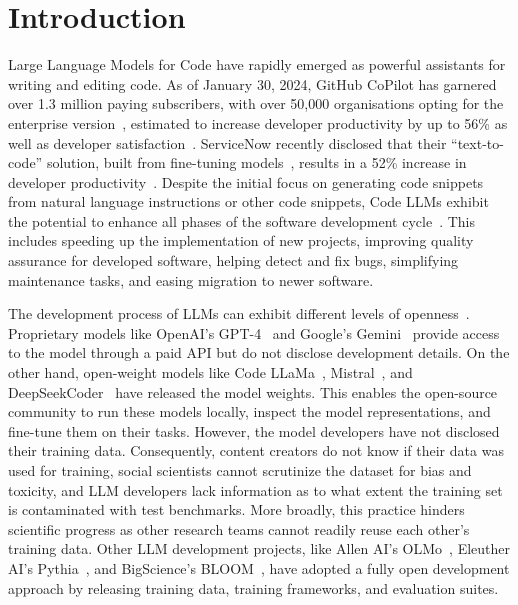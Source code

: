 \documentclass[10pt]{article} %
\begin{document}
\section{Introduction}
Large Language Models for Code \citep[Code LLMs;][]{chen2021evaluating,nijkamp:codegen,roziere2023code,guo2024deepseek} have rapidly emerged as powerful assistants for writing and editing code. As of January 30, 2024, GitHub CoPilot has garnered over 1.3 million paying subscribers, with over 50,000 organisations opting for the enterprise version~\citep{msft_q2_2024}, estimated to increase developer productivity by up to 56\% as well as developer satisfaction~\citep{peng2023impact,ziegler2024measuring}. ServiceNow recently disclosed that their ``text-to-code'' solution, built from fine-tuning \starcoderbase{} models~\citep{li2023starcoder}, results in a 52\% increase in developer productivity~\citep{servicenow2024q4earnings}. Despite the initial focus on generating code snippets from natural language instructions or other code snippets, Code LLMs exhibit the potential to enhance all phases of the software development cycle~\citep{hou2023large,fan2023large,wang2023software,zhuo2023data,chai2023ernie-code}. This includes speeding up the implementation of new projects, improving quality assurance for developed software, helping detect and fix bugs, simplifying maintenance tasks, and easing migration to newer software. 

The development process of LLMs can exhibit different levels of openness~\citep{solaiman2023gradient,ding2022towards,akiki2022bigscience}. Proprietary models like OpenAI's GPT-4~\citep{achiam2023gpt} and Google's Gemini~\citep{team2023gemini} provide access to the model through a paid API but do not disclose development details. On the other hand, open-weight models like Code LLaMa~\citep{roziere2023code}, Mistral~\citep{jiang2023mistral}, and DeepSeekCoder~\citep{guo2024deepseek} have released the model weights. This enables the open-source community to run these models locally, inspect the model representations, and fine-tune them on their tasks. However, the model developers have not disclosed their training data.
Consequently, content creators do not know if their data was used for training, social scientists cannot scrutinize the dataset for bias and toxicity, and LLM developers lack information as to what extent the training set is contaminated with test benchmarks. More broadly, this practice hinders scientific progress as other research teams cannot readily reuse each other's training data. Other LLM development projects, like Allen AI's OLMo~\citep{groeneveld2024olmo}, Eleuther AI's Pythia~\citep{biderman2023pythia}, and BigScience's BLOOM~\citep{bigscience_workshop_2022,scao-bloom},  have adopted a fully open development approach by releasing training data, training frameworks, and evaluation suites. 
\end{document}
